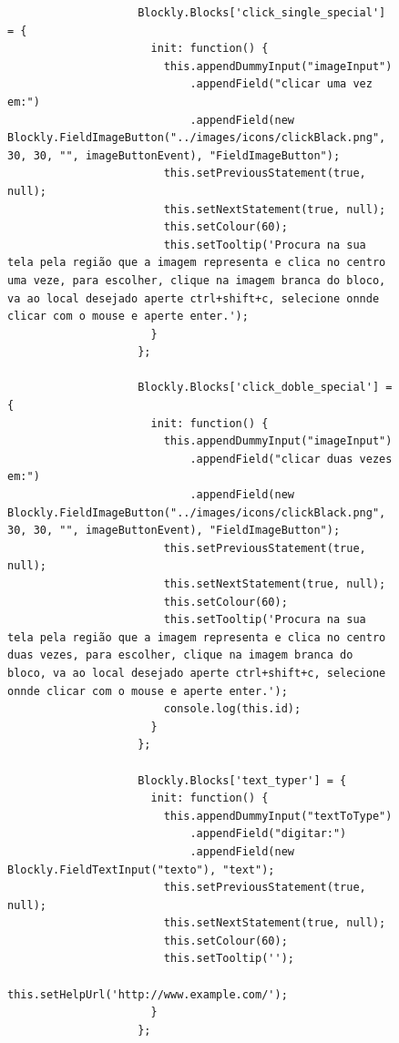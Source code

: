 \documentclass[tg]{mdtufsm}
\begin{document}
                \begin{figure}[!htb]
                \begin{lstlisting}
                    Blockly.Blocks['click_single_special'] = {
                      init: function() {
                        this.appendDummyInput("imageInput")
                            .appendField("clicar uma vez em:")
                            .appendField(new Blockly.FieldImageButton("../images/icons/clickBlack.png", 30, 30, "", imageButtonEvent), "FieldImageButton");
                        this.setPreviousStatement(true, null);
                        this.setNextStatement(true, null);
                        this.setColour(60);
                        this.setTooltip('Procura na sua tela pela região que a imagem representa e clica no centro uma veze, para escolher, clique na imagem branca do bloco, va ao local desejado aperte ctrl+shift+c, selecione onnde clicar com o mouse e aperte enter.');
                      }
                    };

                    Blockly.Blocks['click_doble_special'] = {
                      init: function() {
                        this.appendDummyInput("imageInput")
                            .appendField("clicar duas vezes em:")
                            .appendField(new Blockly.FieldImageButton("../images/icons/clickBlack.png", 30, 30, "", imageButtonEvent), "FieldImageButton");
                        this.setPreviousStatement(true, null);
                        this.setNextStatement(true, null);
                        this.setColour(60);
                        this.setTooltip('Procura na sua tela pela região que a imagem representa e clica no centro duas vezes, para escolher, clique na imagem branca do bloco, va ao local desejado aperte ctrl+shift+c, selecione onnde clicar com o mouse e aperte enter.');
                        console.log(this.id);
                      }
                    };

                    Blockly.Blocks['text_typer'] = {
                      init: function() {
                        this.appendDummyInput("textToType")
                            .appendField("digitar:")
                            .appendField(new Blockly.FieldTextInput("texto"), "text");
                        this.setPreviousStatement(true, null);
                        this.setNextStatement(true, null);
                        this.setColour(60);
                        this.setTooltip('');
                        this.setHelpUrl('http://www.example.com/');
                      }
                    };


\end{lstlisting}
\end{figure}
\end{document}
